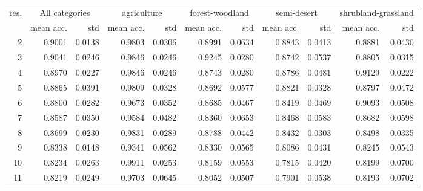    
\begin{tabular}{rrrrrrrrrrr}
\toprule
res. & \multicolumn{2}{c}{All categories} & \multicolumn{2}{c}{agriculture} & \multicolumn{2}{c}{forest-woodland} & \multicolumn{2}{c}{semi-desert} & \multicolumn{2}{c}{shrubland-grassland} \\
           &     mean acc. &    std &                 mean acc. &    std &                     mean acc. &    std &                 mean acc. &    std &                         mean acc. &    std \\
\midrule
         2 &   0.9001 & 0.0138 &               0.9803 & 0.0306 &                   0.8991 & 0.0634 &               0.8843 & 0.0413 &                       0.8881 & 0.0430 \\
         3 &   0.9041 & 0.0246 &               0.9846 & 0.0246 &                   0.9245 & 0.0280 &               0.8742 & 0.0537 &                       0.8805 & 0.0315 \\
         4 &   0.8970 & 0.0227 &               0.9846 & 0.0246 &                   0.8743 & 0.0280 &               0.8786 & 0.0481 &                       0.9129 & 0.0222 \\
         5 &   0.8865 & 0.0391 &               0.9809 & 0.0328 &                   0.8692 & 0.0577 &               0.8821 & 0.0328 &                       0.8797 & 0.0472 \\
         6 &   0.8800 & 0.0282 &               0.9673 & 0.0352 &                   0.8685 & 0.0467 &               0.8419 & 0.0469 &                       0.9093 & 0.0508 \\
         7 &   0.8587 & 0.0350 &               0.9584 & 0.0482 &                   0.8360 & 0.0653 &               0.8468 & 0.0583 &                       0.8682 & 0.0598 \\
         8 &   0.8699 & 0.0230 &               0.9831 & 0.0289 &                   0.8788 & 0.0442 &               0.8432 & 0.0303 &                       0.8498 & 0.0335 \\
         9 &   0.8338 & 0.0148 &               0.9341 & 0.0562 &                   0.8330 & 0.0565 &               0.8086 & 0.0431 &                       0.8245 & 0.0543 \\
        10 &   0.8234 & 0.0263 &               0.9911 & 0.0253 &                   0.8159 & 0.0553 &               0.7815 & 0.0420 &                       0.8199 & 0.0700 \\
        11 &   0.8219 & 0.0249 &               0.9703 & 0.0645 &                   0.8052 & 0.0507 &               0.7901 & 0.0538 &                       0.8193 & 0.0702 \\

\end{tabular}
